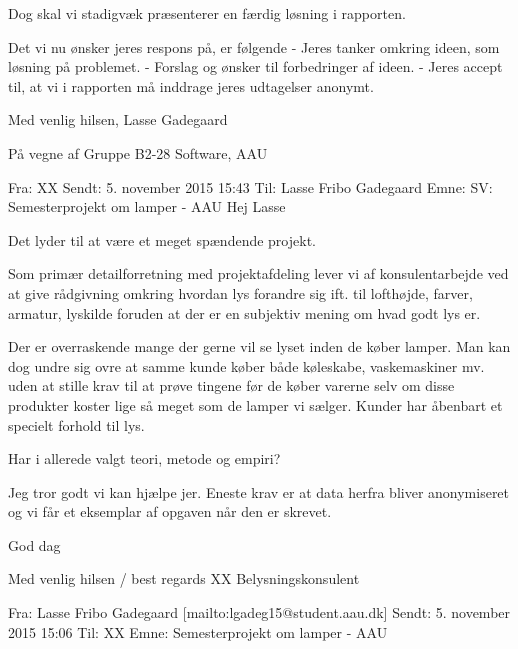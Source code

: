 \documentclass[oneside,a4paper,titlepage]{article}
\begin{document}
\begin{itemize}
Dog skal vi stadigvæk præsenterer en færdig løsning i rapporten. 

Det vi nu ønsker jeres respons på, er følgende
 - Jeres tanker omkring ideen, som løsning på problemet.\newline
 - Forslag og ønsker til forbedringer af ideen. \newline
 - Jeres accept til, at vi i rapporten må inddrage jeres udtagelser anonymt.

Med venlig hilsen,\newline
Lasse Gadegaard
 
På vegne af \newline
Gruppe B2-28\newline
Software, AAU
 
\noindent\makebox[\linewidth]{\rule{\paperwidth}{0.4pt}}

Fra: XX \newline
Sendt: 5. november 2015 15:43\newline
Til: Lasse Fribo Gadegaard\newline
Emne: SV: Semesterprojekt om lamper - AAU\newline
Hej Lasse

Det lyder til at være et meget spændende projekt.
 
Som primær detailforretning med projektafdeling lever vi af konsulentarbejde ved at give rådgivning omkring hvordan lys forandre sig ift. til lofthøjde, farver, armatur, lyskilde foruden at der er en subjektiv mening om hvad godt lys er.

Der er overraskende mange der gerne vil se lyset inden de køber lamper. Man kan dog undre sig ovre at samme kunde køber både køleskabe, vaskemaskiner mv. uden at stille krav til at prøve tingene før de køber varerne selv om disse produkter koster lige så meget som de lamper vi sælger. Kunder har åbenbart et specielt forhold til lys. 

Har i allerede valgt teori, metode og empiri? 

Jeg tror godt vi kan hjælpe jer. Eneste krav er at data herfra bliver anonymiseret og vi får et eksemplar af opgaven når den er skrevet.

God dag

Med venlig hilsen / best regards\newline
XX\newline
Belysningskonsulent

\noindent\makebox[\linewidth]{\rule{\paperwidth}{0.4pt}}

Fra: Lasse Fribo Gadegaard [mailto:lgadeg15@student.aau.dk] \newline
Sendt: 5. november 2015 15:06\newline
Til: XX\newline
Emne: Semesterprojekt om lamper - AAU
 

\end{itemize}
\end{document}
